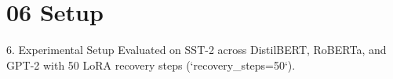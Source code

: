\section{06 Setup}

 6. Experimental Setup
Evaluated on SST-2 across DistilBERT, RoBERTa, and GPT-2 with 50 LoRA recovery steps (`recovery\_steps=50`).
